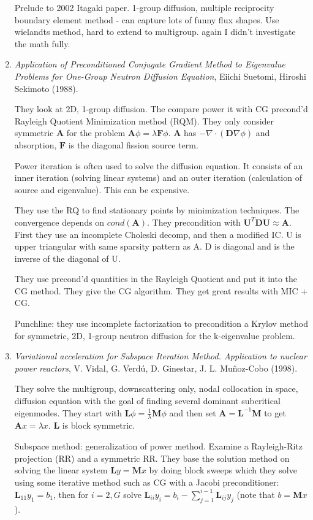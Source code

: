 \documentclass[12pt,twoside]{book}
\newcommand{\ve}[1]{\ensuremath{\mathbf{#1}}}
\begin{document}
\begin{enumerate}
Prelude to 2002 Itagaki paper. 1-group diffusion, multiple reciprocity boundary element method - can capture lots of funny flux shapes. Use wielandts method, hard to extend to multigroup. again I didn't investigate the math fully.

  \item \emph{Application of Preconditioned Conjugate Gradient Method to Eigenvalue Problems for One-Group Neutron Diffusion Equation}, Eiichi Suetomi, Hiroshi Sekimoto (1988). 

They look at 2D, 1-group diffusion. The compare power it with CG precond'd Rayleigh Quotient Minimization method (RQM). They only consider symmetric $\ve{A}$ for the problem $\ve{A}\phi = \lambda \ve{F}\phi$. $\ve{A}$ has $-\nabla\cdot(\ve{D}\nabla\phi)$ and absorption, $\ve{F}$ is the diagonal fission source term.

Power iteration is often used to solve the diffusion equation. It consists of an inner iteration (solving linear systems) and an outer iteration (calculation of source and eigenvalue). This can be expensive.

They use the RQ to find stationary points by minimization techniques. The convergence depends on $cond(\ve{A})$. They precondition with $\ve{U}^T\ve{DU} \approx \ve{A}$. First they use an incomplete Choleski decomp, and then a modified IC. U is upper triangular with same sparsity pattern as A. D is diagonal and is the inverse of the diagonal of U. 

They use precond'd quantities in the Rayleigh Quotient and put it into the CG method. They give the CG algorithm. They get great results with MIC + CG.

Punchline: they use incomplete factorization to precondition a Krylov method for symmetric, 2D, 1-group neutron diffusion for the k-eigenvalue problem. 

\item \emph{Variational acceleration for Subspace Iteration Method. Application to nuclear power reactors}, V. Vidal, G. Verdú, D. Ginestar, J. L. Muñoz-Cobo (1998).

  They solve the multigroup, downscattering only, nodal collocation in space, diffusion equation with the goal of finding several dominant subcritical eigenmodes. They start with $\ve{L}\phi = \frac{1}{\lambda}\ve{M}\phi$ and then set $\ve{A} = \ve{L}^{-1}\ve{M}$ to get $\ve{A}x = \lambda x$. $\ve{L}$ is block symmetric.

  Subspace method: generalization of power method. Examine a Rayleigh-Ritz projection (RR) and a symmetric RR. They base the solution method on solving the linear system $\ve{L}y = \ve{M}x$ by doing block sweeps which they solve using some iterative method such as CG with a Jacobi preconditioner: $\ve{L}_{11}y_1 = b_1$, then for $i=2,G$ solve $\ve{L}_{ii}y_i = b_i - \sum_{j=1}^{i-1}\ve{L}_{ij}y_j$ (note that $b = \ve{M}x$).


\end{enumerate}
\end{document}
